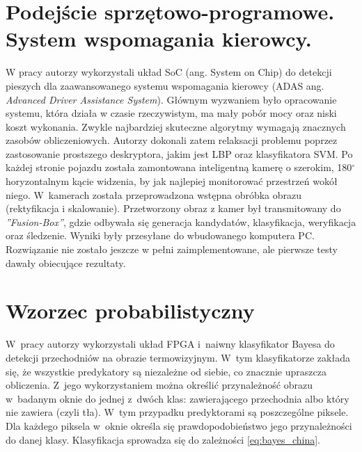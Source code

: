 
\section{Podejście sprzętowo-programowe. System wspomagania kierowcy.}

W pracy \cite{piao2016real} autorzy wykorzystali układ SoC (ang. System on Chip) do detekcji pieszych dla zaawansowanego systemu wspomagania kierowcy (ADAS ang. \textit{Advanced Driver Assistance System}).
Głównym wyzwaniem było opracowanie systemu, która działa w czasie rzeczywistym, ma mały pobór mocy oraz niski koszt wykonania.
Zwykle najbardziej skuteczne algorytmy wymagają znacznych zasobów obliczeniowych. 
Autorzy dokonali zatem relaksacji problemu poprzez zastosowanie prostszego deskryptora, jakim jest LBP oraz klasyfikatora SVM.
Po każdej stronie pojazdu została zamontowana inteligentną kamerę o szerokim, 180$^\circ$ horyzontalnym kącie widzenia, by jak najlepiej monitorować przestrzeń wokół niego.
W~kamerach została przeprowadzona wstępna obróbka obrazu (rektyfikacja i skalowanie).
Przetworzony obraz z kamer był transmitowany do \textit{''Fusion-Box''}, gdzie odbywała się generacja kandydatów, klasyfikacja, weryfikacja oraz śledzenie.
Wyniki były przesyłane do wbudowanego komputera PC.
Rozwiązanie nie zostało jeszcze w pełni zaimplementowane, ale pierwsze testy dawały obiecujące rezultaty.

\section{Wzorzec probabilistyczny}
\label{sec:xiao_2015}
W~pracy \cite{xiao_2015} autorzy wykorzystali układ FPGA i~naiwny klasyfikator Bayesa do detekcji przechodniów na obrazie termowizyjnym. 
W~tym klasyfikatorze zakłada się, że wszystkie predykatory są niezależne od siebie, co znacznie upraszcza obliczenia. 
Z~jego wykorzystaniem można określić przynależność obrazu w~badanym oknie do jednej z~dwóch klas: zawierającego przechodnia albo który nie zawiera (czyli tła). 
W~tym przypadku predyktorami są poszczególne piksele. 
Dla każdego piksela w~oknie określa się prawdopodobieństwo jego przynależności do danej klasy. 
Klasyfikacja sprowadza się do zależności \eqref{eq:bayes_china}.

